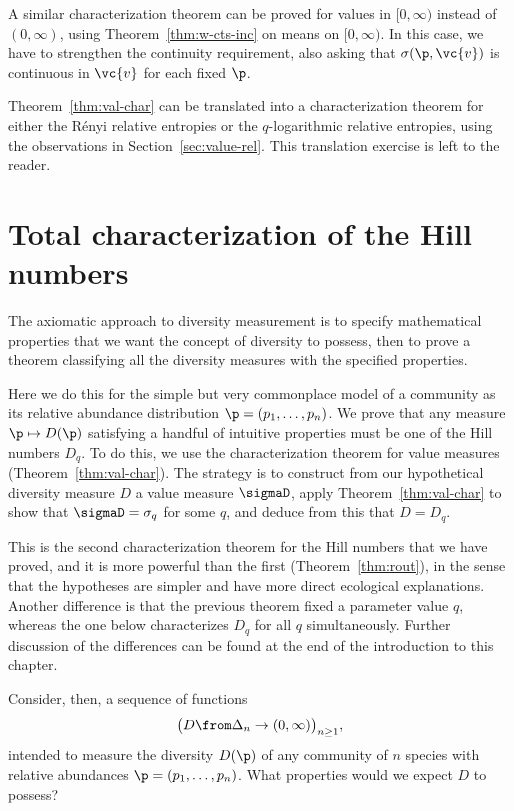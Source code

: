 \begin{remark}
A similar characterization theorem can be proved for values in $[0,
  \infty)$ instead of $(0, \infty)$, using Theorem~\ref{thm:w-cts-inc} on
  means on $[0, \infty)$.  In this case, we have to strengthen the
    continuity requirement, also asking that $\sigma(\p, \vc{v})$ is
    continuous in $\vc{v}$ for each fixed $\p$. 
\end{remark}

Theorem~\ref{thm:val-char} can be translated into a characterization
theorem for either the R\'enyi relative entropies or the $q$-logarithmic
relative entropies, using the observations in Section~\ref{sec:value-rel}.
This translation exercise is left to the reader.


\section{Total characterization of the Hill numbers}

The axiomatic approach to diversity measurement is to specify mathematical
properties that we want the concept of diversity to possess, then to prove
a theorem classifying all the diversity measures with the specified
properties. 

Here we do this for the simple but very commonplace model of a community as
its relative abundance distribution $\p = (p_1, \ldots, p_n)$.  We prove
that any measure $\p \mapsto D(\p)$ satisfying a handful of intuitive
properties must be one of the Hill numbers $D_q$.  To do this, we use the
characterization theorem for value measures (Theorem~\ref{thm:val-char}).
The strategy is to construct from our hypothetical diversity
measure $D$ a value measure $\sigmaD$, apply Theorem~\ref{thm:val-char} to
show that $\sigmaD = \sigma_q$ for some $q$, and deduce from this that $D
= D_q$.

This is the second characterization theorem for the Hill numbers that we
have proved, and it is more powerful than the first
(Theorem~\ref{thm:rout}), in the sense%
%
% 
that the hypotheses are simpler and have more direct ecological
explanations.  Another difference is that the previous theorem fixed a
parameter value $q$, whereas the one below characterizes $D_q$ for all $q$
simultaneously.  Further discussion of the differences can be found at the
end of the introduction to this chapter.

Consider, then, a sequence of functions
\[
\bigl( D \from \Delta_n \to (0, \infty) \bigr)_{n \geq 1},
\]
intended to measure the diversity $D(\p)$ of any community of $n$ species with
relative abundances $\p = (p_1, \ldots, p_n)$.  What properties would we
expect $D$ to possess?

